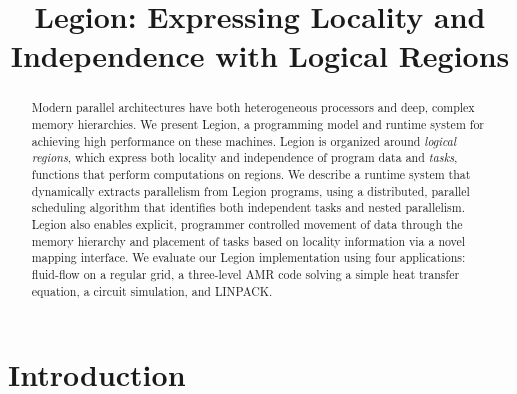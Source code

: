\documentclass[conference]{IEEEtran}
\begin{document}
\pdfpagewidth=8.5in
\pdfpageheight=11in

\title{Legion: Expressing Locality and Independence with Logical Regions}
\author{
}

\maketitle


\begin{abstract}
Modern parallel architectures have both heterogeneous processors and
deep, complex memory hierarchies.  We present Legion, a programming
model and runtime system for achieving high performance on these
machines.  Legion is organized around {\em logical regions}, which
express both locality and independence of program data and {\em
  tasks}, functions that perform computations on regions.  We describe
a runtime system that dynamically extracts parallelism from
Legion programs, using a distributed, parallel scheduling algorithm
that identifies both independent tasks and nested parallelism.  Legion
also enables explicit, programmer controlled movement of data through
the memory hierarchy and placement of tasks based on locality
information via a novel mapping interface.  We evaluate our Legion
implementation using four applications: fluid-flow on a regular grid,
a three-level AMR code solving a simple heat transfer equation, a circuit simulation,
and LINPACK.
\end{abstract}

\section{Introduction}
\label{sect:intro}
\end{document}
